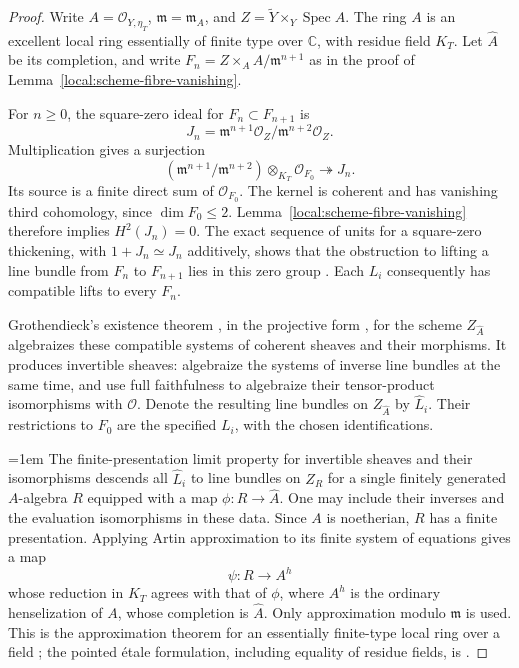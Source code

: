 \begin{proof}
Write $A=\mathcal O_{Y,\eta_T}$, $\mathfrak m=\mathfrak m_A$, and
$Z=\widetilde Y\times_Y\operatorname{Spec}A$.  The ring $A$ is an
excellent local ring essentially of finite type over $\mathbb C$,
with residue field $K_T$.  Let $\widehat A$ be its completion, and
write $F_n=Z\times_A A/\mathfrak m^{n+1}$ as in the proof of
Lemma~\ref{local:scheme-fibre-vanishing}.

For $n\geq0$, the square-zero ideal for $F_n\subset F_{n+1}$ is
\[
 J_n=\mathfrak m^{n+1}\mathcal O_Z/
                       \mathfrak m^{n+2}\mathcal O_Z.
\]
Multiplication gives a surjection
\[
 (\mathfrak m^{n+1}/\mathfrak m^{n+2})
       \otimes_{K_T}\mathcal O_{F_0}\twoheadrightarrow J_n.
\]
Its source is a finite direct sum of $\mathcal O_{F_0}$.  The kernel
is coherent and has vanishing third cohomology, since $\dim F_0\leq2$.
Lemma~\ref{local:scheme-fibre-vanishing} therefore implies
$H^2(J_n)=0$.  The exact sequence of units for a square-zero
thickening, with $1+J_n\simeq J_n$ additively, shows that the
obstruction to lifting a line bundle from $F_n$ to $F_{n+1}$ lies in
this zero group \cite[Tag~0C6R]{Stacks}.  Each $L_i$ consequently has
compatible lifts to every $F_n$.

Grothendieck's existence theorem \cite{EGAIII1}, in the projective
form \cite[Tag~0885]{Stacks}, for the scheme $Z_{\widehat A}$
algebraizes these compatible systems of coherent sheaves
and their morphisms. It produces invertible sheaves: algebraize
the systems of inverse line bundles at the same time, and use full
faithfulness to algebraize their tensor-product isomorphisms with
$\mathcal O$.  Denote the resulting line bundles on
$Z_{\widehat A}$ by $\widehat L_i$.  Their restrictions to $F_0$
are the specified $L_i$, with the chosen identifications.

\begingroup\emergencystretch=1em
The finite-presentation limit property for invertible sheaves and
their isomorphisms \cite[Tags~0B8W and~01ZR]{Stacks} descends all
$\widehat L_i$ to line bundles on $Z_R$ for a single finitely
generated $A$-algebra $R$ equipped with a map
$\phi:R\to\widehat A$.  One may include their inverses and the
evaluation isomorphisms in these data.  Since $A$ is noetherian,
$R$ has a finite presentation.  Applying Artin approximation to its
finite system of equations gives a map
\[
 \psi:R\longrightarrow A^h
\]
whose reduction in $K_T$ agrees with that of $\phi$, where $A^h$ is
the ordinary henselization of $A$, whose completion is $\widehat A$.
Only approximation modulo
$\mathfrak m$ is used.  This is the approximation theorem for an
essentially finite-type local ring over a field
\cite[Theorem~1.10]{Artin1969}; the pointed \'etale
formulation, including equality of residue fields, is
\cite[Tag~07QZ]{Stacks}.
\par\endgroup


\end{proof}
